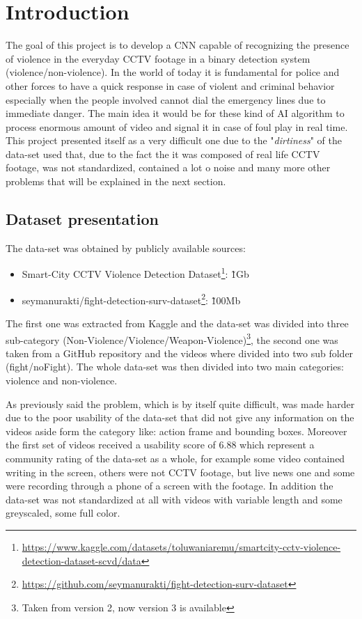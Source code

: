 \chapter{Introduction}
The goal of this project is to develop a CNN capable of recognizing the presence of violence in the everyday CCTV footage in a binary detection system (violence/non-violence). In the world of today it is fundamental for police and other forces to have a quick response in case of violent and criminal behavior especially when the people involved cannot dial the emergency lines due to immediate danger. The main idea it would be for these kind of AI algorithm to process enormous amount of video and signal it in case of foul play in real time. This project presented itself as a very difficult one due to the "\textit{dirtiness}" of the data-set used that, due to the fact the it was composed of real life CCTV footage, was not standardized, contained a lot o noise and many more other problems that will be explained in the next section.

\section{Dataset presentation}
The data-set was obtained by publicly available sources:
\begin{itemize}
	\item Smart-City CCTV Violence Detection Dataset\footnote{\url{https://www.kaggle.com/datasets/toluwaniaremu/smartcity-cctv-violence-detection-dataset-scvd/data}}: \~1Gb
	\item seymanurakti/fight-detection-surv-dataset\footnote{\url{https://github.com/seymanurakti/fight-detection-surv-dataset}}: \~100Mb
\end{itemize}

The first one was extracted from Kaggle and the data-set was divided into three sub-category (Non-Violence/Violence/Weapon-Violence)\footnote{Taken from version 2, now version 3 is available}, the second one was taken from a GitHub repository and the videos where divided into two sub folder (fight/noFight). The whole data-set was then divided into two main categories: violence and non-violence.

As previously said the problem, which is by itself quite difficult, was made harder due to the poor usability of the data-set that did not give any information on the videos aside form the category like: action frame and bounding boxes. Moreover the first set of videos received a usability score of 6.88 which represent a community rating of the data-set as a whole, for example some video contained writing in the screen, others were not CCTV footage, but live news one and some were recording through a phone of a screen with the footage. In addition the data-set was not standardized at all with videos with variable length and some greyscaled, some full color.
